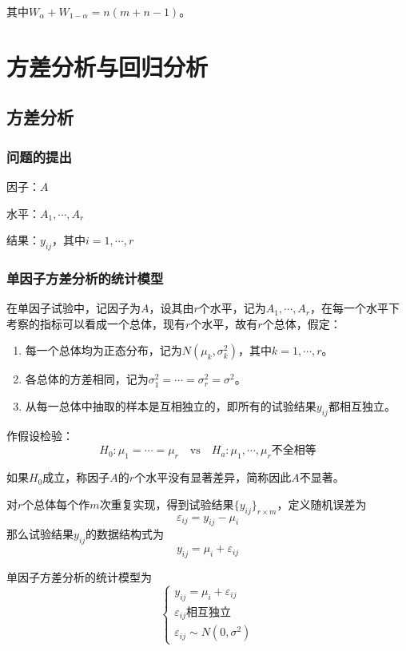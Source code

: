 \documentclass[lang = cn, scheme = chinese, thmcnt = section]{elegantbook}
\begin{document}
其中$W_\alpha+W_{1-\alpha}=n(m+n-1)$。

\chapter{方差分析与回归分析}

\section{方差分析}

\subsection{问题的提出}

因子：$A$

水平：$A_1,\cdots,A_r$

结果：$y_{ij}$，其中$i=1,\cdots,r$

\subsection{单因子方差分析的统计模型}

在单因子试验中，记因子为$A$，设其由$r$个水平，记为$A_1,\cdots,A_r$，在每一个水平下考察的指标可以看成一个总体，现有$r$个水平，故有$r$个总体，假定：

\begin{enumerate}
	\item 每一个总体均为正态分布，记为$N(\mu_k,\sigma^2_k)$，其中$k=1,\cdots,r$。
	\item 各总体的方差相同，记为$\sigma_1^2=\cdots=\sigma_r^2=\sigma^2$。
	\item 从每一总体中抽取的样本是互相独立的，即所有的试验结果$y_{ij}$都相互独立。
\end{enumerate}

作假设检验：
$$
H_0:\mu_1=\cdots=\mu_r
\quad \mathrm{vs} \quad 
H_a:\mu_1,\cdots,\mu_r不全相等
$$

如果$H_0$成立，称因子$A$的$r$个水平没有显著差异，简称因此$A$不显著。

对$r$个总体每个作$m$次重复实现，得到试验结果$\{y_{ij}\}_{r\times m}$，定义随机误差为
$$
\varepsilon_{ij}=y_{ij}-\mu_{i}
$$
那么试验结果$y_{ij}$的数据结构式为
$$
y_{ij}=\mu_{i}+\varepsilon_{ij}
$$

单因子方差分析的统计模型为
$$
\begin{cases}
	y_{ij}=\mu_{i}+\varepsilon_{ij}\\
	\varepsilon_{ij}\text{相互独立}\\
	\varepsilon_{ij}\sim N(0,\sigma^2)
\end{cases}
$$
\end{document}
